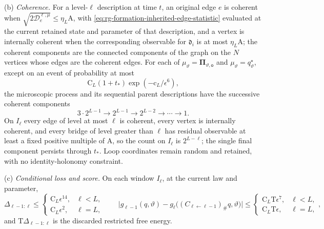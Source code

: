 (b) \emph{Coherence.} For a level-\(\ell\) description at time \(t\), an
original edge \(e\) is coherent when
\(\sqrt{2\mathcal D_e^{\ell,\mu}}\le\eta_L\mathrm A\), with
\cref{eq:rg-formation-inherited-edge-statistic} evaluated at the current
retained state and parameter of that description, and a vertex is internally
coherent when the corresponding observable for \(\mathfrak d_i\) is at most
\(\eta_L\mathrm A\); the coherent components are the connected components of
the graph on the \(N\) vertices whose edges are the coherent edges. For each
of \(\mu_\vartheta=\boldsymbol\Pi_{\vartheta,\mathsf o}\) and
\(\mu_\vartheta=q^\star_\vartheta\), except on an event of probability at most
\begin{equation}
\mathrm C_L(1+t_*)\exp(-\mathrm c_L/\epsilon^6),
\label{eq:rg-formation-coherence-probability}
\end{equation}
the microscopic process and its sequential parent descriptions have the
successive coherent components
\begin{equation}
3\cdot2^{L-1}\longrightarrow2^{L-1}
\longrightarrow2^{L-2}\longrightarrow\cdots\longrightarrow1.
\label{eq:rg-formation-agent-counts}
\end{equation}
On \(I_\ell\) every edge of level at most \(\ell\) is coherent, every vertex is
internally coherent, and every bridge of level greater than \(\ell\) has
residual observable at least a fixed positive multiple of \(\mathrm A\), so the
count on \(I_\ell\) is \(2^{L-\ell}\); the single final component persists
through \(t_*\). Loop coordinates remain random and retained, with no
identity-holonomy constraint.

(c) \emph{Conditional loss and score.} On each window \(I_\ell\), at the
current law and parameter,
\begin{equation}
\Delta_{\ell-1:\ell}
 \le
 \begin{cases}
\mathrm C_L\epsilon^{14},&\ell<L,\\
\mathrm C_L\epsilon^2,&\ell=L,
\end{cases}
\qquad
\bigl|g_{\ell-1}(q,\vartheta)
 -g_\ell\bigl((C_{\ell\leftarrow\ell-1})_\#q,\vartheta\bigr)\bigr|
 \le
 \begin{cases}
\mathrm C_L\mathrm T\epsilon^7,&\ell<L,\\
\mathrm C_L\mathrm T\epsilon,&\ell=L,
\end{cases},
\label{eq:rg-formation-conditional-score-bounds}
\end{equation}
and \(\mathrm T\Delta_{\ell-1:\ell}\) is the discarded restricted free energy.

